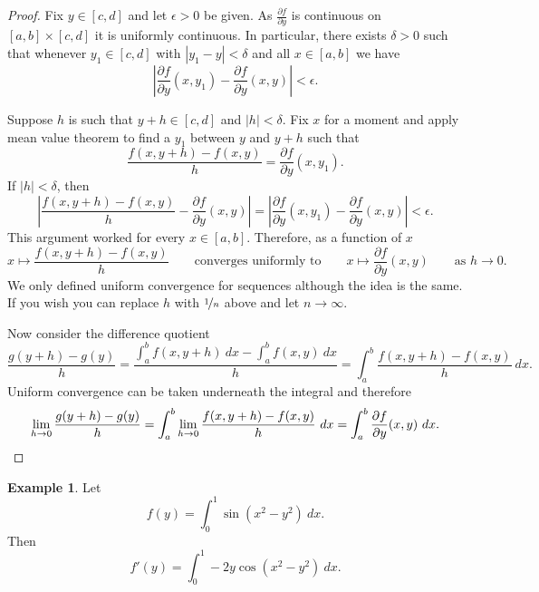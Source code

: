 \documentclass[12pt]{book}
\newcommand{\abs}[1]{\left\lvert {#1} \right\rvert}
\theoremstyle{plain}
\theoremstyle{remark}
\theoremstyle{definition}
\theoremstyle{exercise}
\theoremstyle{example}
\newtheorem{example}[thm]{Example}
\begin{document}
\begin{proof}
Fix $y \in [c,d]$ and let $\epsilon > 0$ be given.
As $\frac{\partial f}{\partial y}$ is continuous on $[a,b] \times [c,d]$ it
is uniformly continuous.  In particular, there exists $\delta > 0$ such that
whenever $y_1 \in [c,d]$ with
$\abs{y_1-y} < \delta$ and all $x \in [a,b]$ we have
\begin{equation*}
\abs{\frac{\partial f}{\partial y}(x,y_1)-\frac{\partial f}{\partial y}(x,y)} < \epsilon .
\end{equation*}

Suppose $h$ is such that $y+h \in [c,d]$ and $\abs{h} < \delta$.
Fix $x$ for a moment
and apply mean value theorem to find a $y_1$ between $y$ and $y+h$ such that
\begin{equation*}
\frac{f(x,y+h)-f(x,y)}{h}
=
\frac{\partial f}{\partial y}(x,y_1) .
\end{equation*}
If $\abs{h} < \delta$, then
\begin{equation*}
\abs{
\frac{f(x,y+h)-f(x,y)}{h}
-
\frac{\partial f}{\partial y}(x,y) 
}
=
\abs{
\frac{\partial f}{\partial y}(x,y_1) 
-
\frac{\partial f}{\partial y}(x,y) 
}
< \epsilon .
\end{equation*}
This argument worked for every $x \in [a,b]$.  Therefore, as a function of
$x$
\begin{equation*}
x \mapsto \frac{f(x,y+h)-f(x,y)}{h}
\qquad
\text{converges uniformly to}
\qquad
x \mapsto \frac{\partial f}{\partial y}(x,y)
\qquad
\text{as $h \to 0$} .
\end{equation*}
We only defined uniform convergence for sequences although the idea is the
same.  If you wish you can replace $h$ with $\nicefrac{1}{n}$ above and let
$n \to \infty$.

Now consider the difference quotient
\begin{equation*}
\frac{g(y+h)-g(y)}{h}
=
\frac{\int_a^b f(x,y+h) ~dx -
\int_a^b f(x,y) ~dx }{h}
=
\int_a^b \frac{f(x,y+h)-f(x,y)}{h} ~dx .
\end{equation*}
Uniform convergence can be taken underneath the integral and therefore
\begin{equation*}
\lim_{h\to 0}
\frac{g(y+h)-g(y)}{h}
= 
\int_a^b 
\lim_{h\to 0}
\frac{f(x,y+h)-f(x,y)}{h} ~dx 
=
\int_a^b 
\frac{\partial f}{\partial y}(x,y) ~dx . \qedhere
\end{equation*}
\end{proof}

\begin{example}
Let
\begin{equation*}
f(y) = \int_0^1 \sin(x^2-y^2) ~dx .
\end{equation*}
Then
\begin{equation*}
f'(y) = \int_0^1 -2y\cos(x^2-y^2) ~dx .
\end{equation*}
\end{example}
\end{document}
